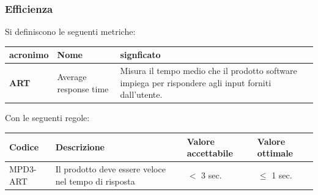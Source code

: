 \subsubsection{Efficienza}
Si definiscono le seguenti metriche:
\begin{table}[h!]
\centering
\def\arraystretch{1.5}
\begin{tabular}{ |m{2cm}|m{5.5cm}|m{6.5cm}| }
\hline
\rowcolor{lightgray!30}
\textbf{acronimo} & \textbf{Nome} & \textbf{signficato}\\
\hline
\textbf{ART} & Average response time & Misura il tempo medio che il prodotto software impiega per rispondere agli input forniti dall'utente.\\
\hline
\end{tabular}
\end{table}
\par Con le seguenti regole:
\begin{table}[h!]
\centering
\def\arraystretch{1.5}
\begin{tabular}{ |>{\centering\arraybackslash}m{2.5cm}|>{\centering\arraybackslash}m{5.5cm}|>{\centering\arraybackslash}m{3cm}|>{\centering\arraybackslash}m{3cm}| }
\hline
\rowcolor{black}
\textbf{\color{white} Codice} & \textbf{\color{white} Descrizione} & \textbf{\color{white} Valore accettabile} & \textbf{\color{white} Valore ottimale}\\
\hline
MPD3-ART & Il prodotto deve essere veloce nel tempo di risposta & $<$ 3 sec. & $\leq$ 1 sec. \\
\hline
\end{tabular}
\end{table}

